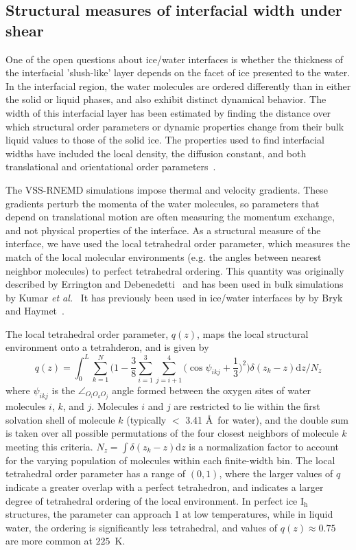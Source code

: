 \documentclass[aps,jcp,preprint,showpacs,superscriptaddress,groupedaddress]{revtex4}  %
\begin{document}
\subsection{Structural measures of interfacial width under shear}
One of the open questions about ice/water interfaces is whether the
thickness of the interfacial 'slush-like' layer depends on the
facet of ice presented to the water.  In the interfacial region, the water
molecules are ordered differently than in either the solid or liquid
phases, and also exhibit distinct dynamical behavior.  The width of
this interfacial layer has been estimated by finding the distance
over which structural order parameters or dynamic properties change
from their bulk liquid values to those of the solid ice.  The
properties used to find interfacial widths have included the local
density, the diffusion constant, and both translational and
orientational order
parameters~\cite{Karim88,Karim90,Hayward01,Hayward02,Bryk02,Gay02,Louden13}.

The VSS-RNEMD simulations impose thermal and velocity gradients.
These gradients perturb the momenta of the water molecules, so
parameters that depend on translational motion are often measuring the
momentum exchange, and not physical properties of the interface. As a
structural measure of the interface, we have used the local
tetrahedral order parameter, which measures the match of the local
molecular environments (e.g. the angles between nearest neighbor
molecules) to perfect tetrahedral ordering.  This quantity was
originally described by Errington and Debenedetti~\cite{Errington01}
and has been used in bulk simulations by Kumar \textit{et
  al.}~\cite{Kumar09} It has previously been used in ice/water
interfaces by by Bryk and Haymet~\cite{Bryk04b}.

The local tetrahedral order parameter, $q(z)$, maps the local structural 
environment onto a tetrahderon, and is given by
\begin{equation}
q(z) = \int_0^L \sum_{k=1}^{N} \Bigg(1 -\frac{3}{8}\sum_{i=1}^{3}
\sum_{j=i+1}^{4} \bigg(\cos\psi_{ikj}+\frac{1}{3}\bigg)^2\Bigg)
\delta(z_{k}-z)\mathrm{d}z \Bigg/ N_z
\label{eq:qz}
\end{equation}
where $\psi_{ikj}$ is the $\angle_{O_{i}O_{k}O_{j}}$ angle formed between the 
oxygen sites of water molecules $i$, $k$, and $j$. Molecules $i$ and $j$ are
restricted to lie within the first solvation shell of molecule $k$ 
(typically $<$ 3.41 \AA\ for water), and the double sum is taken over all
possible permutations of the four closest neighbors of molecule $k$
meeting this criteria. 
$N_z = \int \delta(z_k - z) \mathrm{d}z$ is a normalization factor to 
account for the varying population of molecules within each finite-width bin.
The local tetrahedral order parameter has a range of $(0,1)$, where the
larger values of $q$ indicate a greater overlap with a perfect tetrahedron, and
indicates a larger degree of tetrahedral ordering
of the local environment.  In perfect ice I$_\mathrm{h}$ structures,
the parameter can approach 1 at low temperatures, while in liquid
water, the ordering is significantly less tetrahedral, and values of
$q(z) \approx 0.75$ are more common at $225$~K.
\end{document}
